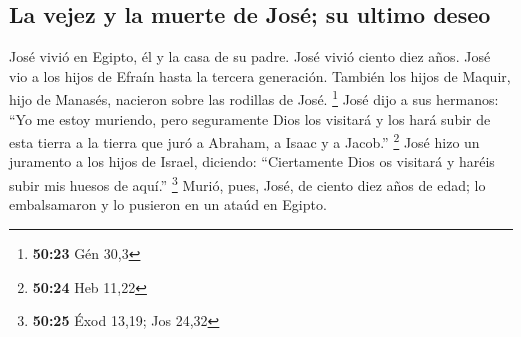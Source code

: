\hypertarget{la-vejez-y-la-muerte-de-josuxe9-su-ultimo-deseo}{%
\subsection{La vejez y la muerte de José; su ultimo
deseo}\label{la-vejez-y-la-muerte-de-josuxe9-su-ultimo-deseo}}

 José vivió en Egipto, él y la casa de su padre. José
vivió ciento diez años.  José vio a los hijos de Efraín
hasta la tercera generación. También los hijos de Maquir, hijo de
Manasés, nacieron sobre las rodillas de José. \footnote{\textbf{50:23}
  Gén 30,3}  José dijo a sus hermanos: ``Yo me estoy
muriendo, pero seguramente Dios los visitará y los hará subir de esta
tierra a la tierra que juró a Abraham, a Isaac y a Jacob.'' \footnote{\textbf{50:24}
  Heb 11,22}  José hizo un juramento a los hijos de
Israel, diciendo: ``Ciertamente Dios os visitará y haréis subir mis
huesos de aquí.'' \footnote{\textbf{50:25} Éxod 13,19; Jos 24,32}
 Murió, pues, José, de ciento diez años de edad; lo
embalsamaron y lo pusieron en un ataúd en Egipto.
